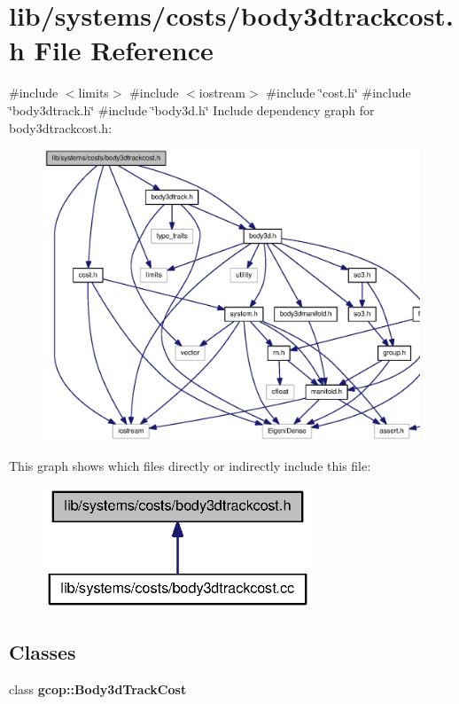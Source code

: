 \section{lib/systems/costs/body3dtrackcost.h \-File \-Reference}
\label{body3dtrackcost_8h}
{\ttfamily \#include $<$limits$>$}\*
{\ttfamily \#include $<$iostream$>$}\*
{\ttfamily \#include \char`\"{}cost.\-h\char`\"{}}\*
{\ttfamily \#include \char`\"{}body3dtrack.\-h\char`\"{}}\*
{\ttfamily \#include \char`\"{}body3d.\-h\char`\"{}}\*
\-Include dependency graph for body3dtrackcost.\-h\-:
\nopagebreak
\begin{figure}[H]
\begin{center}
\leavevmode
\includegraphics[width=350pt]{body3dtrackcost_8h__incl}
\end{center}
\end{figure}
\-This graph shows which files directly or indirectly include this file\-:
\nopagebreak
\begin{figure}[H]
\begin{center}
\leavevmode
\includegraphics[width=226pt]{body3dtrackcost_8h__dep__incl}
\end{center}
\end{figure}
\subsection*{\-Classes}
\begin{DoxyCompactItemize}
\item 
class {\bf gcop\-::\-Body3d\-Track\-Cost}
\end{DoxyCompactItemize}
